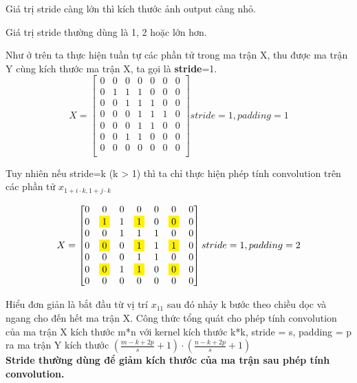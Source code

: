 Giá trị stride càng lớn thì kích thước ảnh output càng nhỏ.

Giá trị stride thường dùng là 1, 2 hoặc lớn hơn.


Như ở trên ta thực hiện tuần tự các phần tử trong ma trận X, thu được ma trận Y cùng kích thước ma trận X, ta gọi là \textbf{stride}=1.
\begin{equation}
X= \begin{bmatrix}
    0 & 0 & 0 & 0 & 0 & 0 & 0 \\
    0 & 1 & 1 & 1 & 0 & 0 & 0 \\
    0 & 0 & 1 & 1 & 1 & 0 & 0 \\
    0 & 0 & 0 & 1 & 1 & 1 & 0 \\
    0 & 0 & 0 & 1 & 1 & 0 & 0 \\
    0 & 0 & 1 & 1 & 0 & 0 & 0 \\
    0 & 0 & 0 & 0 & 0 & 0 & 0 \\
\end{bmatrix}{stride =1 , padding=1}
\end{equation}

Tuy nhiên nếu stride=k (k > 1) thì ta chỉ thực hiện phép tính convolution trên các phần tử \(x_{1+i \cdot k , 1+j \cdot k}\)

\begin{equation}
X= \begin{bmatrix}
    0 & 0 & 0 & 0 & 0 & 0 & 0 \\
    0 & \colorbox{yellow}{$1$} & 1 & \colorbox{yellow}{$1$} & 0 & \colorbox{yellow}{$0$} & 0 \\
    0 & 0 & 1 & 1 & 1 & 0 & 0 \\
    0 & \colorbox{yellow}{$0$} & 0 & \colorbox{yellow}{$1$} & 1 & \colorbox{yellow}{$1$} & 0 \\
    0 & 0 & 0 & 1 & 1 & 0 & 0 \\
    0 & \colorbox{yellow}{$0$} & 1 & \colorbox{yellow}{$1$} & 0 & \colorbox{yellow}{$0$} & 0 \\
    0 & 0 & 0 & 0 & 0 & 0 & 0 \\
\end{bmatrix}{stride =1 , padding=2}
\end{equation}

Hiểu đơn giản là bắt đầu từ vị trí \(x_{11}\) sau đó nhảy k bước theo chiều dọc và ngang cho đến hết ma trận X.
Công thức tổng quát cho phép tính convolution của ma trận X kích thước m*n với kernel kích thước k*k, stride = s, padding = p ra ma trận Y kích thước \(
(\frac{{m-k+2p}}{{s}}+1) \cdot (\frac{{n-k+2p}}{{s}}+1)\)\\
\textbf{Stride thường dùng để giảm kích thước của ma trận sau phép tính convolution.}
